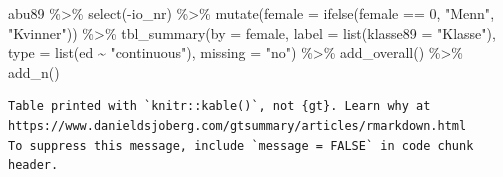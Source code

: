 \documentclass[
  letterpaper,
  DIV=11,
  numbers=noendperiod]{scrreprt}
\newenvironment{Shaded}{\begin{snugshade}}{\end{snugshade}}
\newcommand{\AttributeTok}[1]{\textcolor[rgb]{0.40,0.45,0.13}{#1}}
\newcommand{\DecValTok}[1]{\textcolor[rgb]{0.68,0.00,0.00}{#1}}
\newcommand{\FunctionTok}[1]{\textcolor[rgb]{0.28,0.35,0.67}{#1}}
\newcommand{\NormalTok}[1]{\textcolor[rgb]{0.00,0.23,0.31}{#1}}
\newcommand{\SpecialCharTok}[1]{\textcolor[rgb]{0.37,0.37,0.37}{#1}}
\newcommand{\StringTok}[1]{\textcolor[rgb]{0.13,0.47,0.30}{#1}}
\theoremstyle{definition}
\theoremstyle{remark}
\begin{document}
\begin{Shaded}
\begin{Highlighting}[]
\NormalTok{abu89 }\SpecialCharTok{\%\textgreater{}\%} 
  \FunctionTok{select}\NormalTok{(}\SpecialCharTok{{-}}\NormalTok{io\_nr) }\SpecialCharTok{\%\textgreater{}\%} 
  \FunctionTok{mutate}\NormalTok{(}\AttributeTok{female =} \FunctionTok{ifelse}\NormalTok{(female }\SpecialCharTok{==} \DecValTok{0}\NormalTok{, }\StringTok{"Menn"}\NormalTok{, }\StringTok{"Kvinner"}\NormalTok{)) }\SpecialCharTok{\%\textgreater{}\%} 
    \FunctionTok{tbl\_summary}\NormalTok{(}\AttributeTok{by =}\NormalTok{ female, }
                \AttributeTok{label =} \FunctionTok{list}\NormalTok{(}\AttributeTok{klasse89 =} \StringTok{"Klasse"}\NormalTok{), }
              \AttributeTok{type =} \FunctionTok{list}\NormalTok{(ed }\SpecialCharTok{\textasciitilde{}} \StringTok{"continuous"}\NormalTok{), }
              \AttributeTok{missing =} \StringTok{"no"}\NormalTok{) }\SpecialCharTok{\%\textgreater{}\%} 
  \FunctionTok{add\_overall}\NormalTok{() }\SpecialCharTok{\%\textgreater{}\%} 
  \FunctionTok{add\_n}\NormalTok{()}
\end{Highlighting}
\end{Shaded}

\begin{verbatim}
Table printed with `knitr::kable()`, not {gt}. Learn why at
https://www.danieldsjoberg.com/gtsummary/articles/rmarkdown.html
To suppress this message, include `message = FALSE` in code chunk header.
\end{verbatim}
\end{document}
